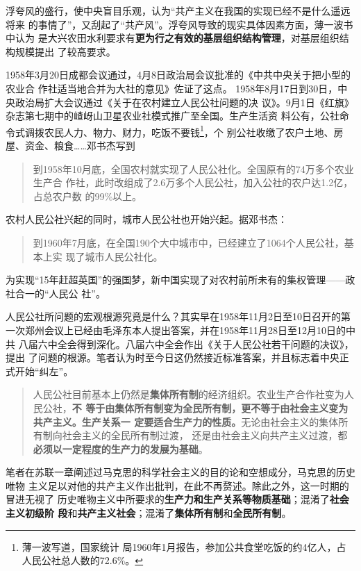 浮夸风的盛行，使中央盲目乐观，认为“共产主义在我国的实现已经不是什么遥远将来
的事情了”，又刮起了“共产风”。浮夸风导致的现实具体因素方面，薄一波书中认为
是大兴农田水利要求有\textbf{更为行之有效的基层组织结构管理}，对基层组织结构规模提出
了较高要求。

1958年3月20日成都会议通过，4月8日政治局会议批准的《中共中央关于把小型的农业合
作社适当地合并为大社的意见》佐证了这点。\cite[728-730]{boyibo}
1958年8月17日到30日，中央政治局扩大会议通过《关于在农村建立人民公社问题的决
议》。9月1日《红旗》杂志第七期中的嵖岈山卫星农业社模式推广至全国。生产生活资
料公有，公社命令式调拨农民人力、物力、财力，吃饭不要钱\footnote{薄一波写道，国家统计
  局1960年1月报告，参加公共食堂吃饭的约4亿人，占人民公社总人数的72.6\%。}，个
别公社收缴了农户土地、房屋、资金、粮食……邓书杰写到
\begin{quotation}
  到1958年10月底，全国农村就实现了人民公社化。全国原有的74万多个农业生产合
  作社，此时改组成了2.6万多个人民公社，加入公社的农户达1.2亿，占总农户数
  的99\%以上。
\end{quotation}

农村人民公社兴起的同时，城市人民公社也开始兴起。据邓书杰：
\begin{quotation}
  到1960年7月底，在全国190个大中城市中，已经建立了1064个人民公社，基本上实
  现了城市人民公社化。
\end{quotation}

为实现“15年赶超英国”的强国梦，新中国实现了对农村前所未有的集权管理——政社合一的“人民公
社”。

人民公社所问题的宏观根源究竟是什么？其实早在1958年11月2日至10日召开的第
一次郑州会议上已经由毛泽东本人提出答案，并在1958年11月28日至12月10日的中共
八届六中全会得到深化。八届六中全会作出《关于人民公社若干问题的决议》，提出
了问题的根源。笔者认为时至今日这仍然接近标准答案，并且标志着中央正式开始“纠左”。
\begin{quotation}
  人民公社目前基本上仍然是\textbf{集体所有制}的经济组织。农业生产合作社变为人民公社，\textbf{不
  等于由集体所有制变为全民所有制，更不等于由社会主义变为共产主义。生产关系一
  定要适合生产力的性质。}无论由社会主义的集体所有制向社会主义的全民所有制过渡，
  还是由社会主义向共产主义过渡，都\textbf{必须以一定程度的生产力的发展为基础}。
\end{quotation}

笔者在苏联一章阐述过马克思的科学社会主义的目的论和空想成分，马克思的历史唯物
主义足以对他的共产主义作出批判，在此不再赘述。除此之外，这一时期的冒进无视了
历史唯物主义中所要求的\textbf{生产力和生产关系等物质基础}；混淆了\textbf{社会主义初级阶
  段}和\textbf{共产主义社会}；混淆了\textbf{集体所有制}和\textbf{全民所有制}。


